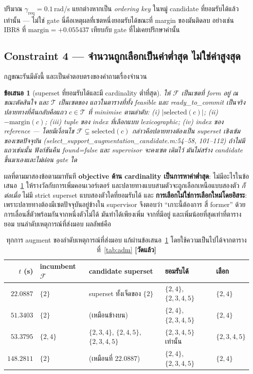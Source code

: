 \documentclass[12pt,a4paper]{article}
\newtheorem{proposition}{ข้อเสนอ}
\theoremstyle{remark}
\newcommand{\greq}{\gamma_{\mathrm{req}}}
\newcommand{\code}[1]{{\ttfamily\small\hyphenchar\font=-1 #1}}
\newcommand{\measured}{\textcolor{ok}{\textbf{[วัดแล้ว]}}}
\begin{document}
ปริมาณ $\greq = 0.1$\,rad/s แยกต่างหากเป็น \emph{ordering key} ในหมู่ candidate
ที่ยอมรับได้แล้วเท่านั้น --- ไม่ใช่ gate นี่คือเหตุผลที่เซตหนึ่งยอมรับได้ขณะที่
\code{margin} ของมันติดลบ อย่างเช่น IBR8 ที่ $\mathrm{margin} = +0.055437$
เทียบกับ gate ที่ไม่เคยปรึกษาค่านั้น

\subsection{Constraint 4 --- จำนวนถูกเลือกเป็นค่าต่ำสุด ไม่ใช่ค่าสูงสุด}

กฎขณะรันมีดังนี้ และเป็นคำตอบตรงของคำถามเรื่องจำนวน

\begin{proposition}[superset ที่ยอมรับได้และมี cardinality ต่ำที่สุด]
\label{prop:superset}
ให้ $\mathcal{F}$ เป็นเซตที่ form อยู่ ณ ขณะตัดสินใจ และ $\mathcal{T}$ เป็นเซตของ
แถวในตารางที่ทั้ง \code{feasible} และ \code{ready\_to\_commit} เป็นจริง
ปลายทางที่คืนกลับคือแถว $c \in \mathcal{T}$ ที่ minimise ตามลำดับ:
(i) $|\mathrm{selected}(c)|$; (ii) $-\mathrm{margin}(c)$; (iii) tuple ของ index
ที่เลือกแบบ lexicographic; (iv) index ของ reference --- โดยมีเงื่อนไข
$\mathcal{F} \subsetneq \mathrm{selected}(c)$ กล่าวคือปลายทางต้องเป็น superset
\emph{เชิงเข้ม}ของเซตปัจจุบัน
\code{(select\_support\_augmentation\_candidate.m:54--58, 101--112)}
ถ้าไม่มีแถวเช่นนั้น ฟังก์ชันคืน \code{found=false} และ supervisor จะคงเซต
เดิมไว้ มันไม่สร้าง candidate ขึ้นมาเองและไม่ผ่อน gate ใด
\end{proposition}

ผลที่ตามมาสองข้อตามมาทันที \textbf{objective ด้าน cardinality เป็นการหาค่าต่ำสุด}:
ไม่มีอะไรในข้อเสนอ~\ref{prop:superset} ให้รางวัลกับการเพิ่มคอนเวอร์เตอร์
และปลายทางแบบสามตัวจะถูกเลือกเหนือแบบสองตัว \emph{ก็ต่อเมื่อ} ไม่มี strict
superset แบบสองตัวใดที่ยอมรับได้ และ \textbf{การเลือกไม่ใช่การเลือกใหม่โดยอิสระ}:
เพราะปลายทางต้องมีเซตปัจจุบันอยู่ข้างใน supervisor จึงตอบว่า ``เกาะนี้ต้องการ
สี่ former'' ด้วยการเลื่อนสี่ตัวพร้อมกันจากหนึ่งตัวไม่ได้ มันทำได้เพียงเพิ่ม
จากที่มีอยู่ และเพิ่มน้อยที่สุดเท่าที่ตารางยอม บนลำดับเหตุการณ์ที่ส่งมอบ
ผลลัพธ์คือ

\begin{table}[H]
\centering
\small
\begin{tabularx}{\textwidth}{@{}r l X l l@{}}
\toprule
$t$ (s) & \textbf{ incumbent $\mathcal{F}$} & \textbf{candidate superset} & \textbf{ยอมรับได้} & \textbf{เลือก}\\
\midrule
$22.0887$ & $\{2\}$ & superset ทั้งเจ็ดของ $\{2\}$
          & $\{2,4\}$, $\{2,3,4,5\}$ & $\{2,4\}$\\
$51.3403$ & $\{2\}$ & (เหมือนข้างบน) & $\{2,4\}$, $\{2,3,4,5\}$ & $\{2,4\}$\\
$53.3795$ & $\{2,4\}$ & $\{2,3,4\}$, $\{2,4,5\}$, $\{2,3,4,5\}$ & $\{2,3,4,5\}$ เท่านั้น & $\{2,3,4,5\}$\\
$148.2811$& $\{2\}$ & (เหมือนที่ $22.0887$) & $\{2,4\}$, $\{2,3,4,5\}$ & $\{2,4\}$\\
\bottomrule
\end{tabularx}
\caption{ทุกการ augment ของลำดับเหตุการณ์ที่ส่งมอบ แก้ผ่านข้อเสนอ~\ref{prop:superset}
โดยใช้ความเป็นไปได้จากตารางที่~\ref{tab:adm} \measured}
\label{tab:resolution}
\end{table}
\end{document}
